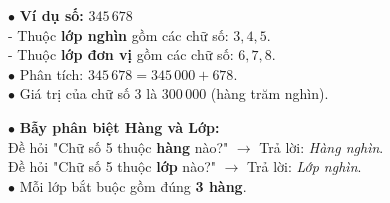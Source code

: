 \documentclass[14pt,a4paper,oneside]{extbook}
\begin{document}
\vspace{2.5mm}

\noindent
\begin{minipage}[t]{0.54\textwidth}
  \begin{tcolorbox}[
    enhanced,
    title={\footnotesize\bfseries\color{white}\faKey\ Phân tích số theo từng lớp},
    colback=green!3!white,
    colframe=green!60!black,
    arc=2.5mm, boxrule=0.8pt, top=1.8mm, bottom=1.8mm, left=2.2mm, right=2.2mm
  ]
    \footnotesize
    $\bullet$ \textbf{Ví dụ số:} $345\,678$\\
    - Thuộc \textbf{lớp nghìn} gồm các chữ số: $3, 4, 5$.\\
    - Thuộc \textbf{lớp đơn vị} gồm các chữ số: $6, 7, 8$.\\
    $\bullet$ Phân tích: $345\,678 = 345\,000 + 678$.\\
    $\bullet$ Giá trị của chữ số $3$ là $300\,000$ (hàng trăm nghìn).
  \end{tcolorbox}
\end{minipage}%
\hfill
\begin{minipage}[t]{0.44\textwidth}
  \begin{tcolorbox}[
    enhanced,
    title={\footnotesize\bfseries\color{white}\faExclamationTriangle\ Mẹo tránh bẫy trắc nghiệm},
    colback=red!2!white,
    colframe=red!70!black,
    arc=2.5mm, boxrule=0.8pt, top=1.8mm, bottom=1.8mm, left=2.2mm, right=2.2mm
  ]
    \footnotesize
    $\bullet$ \textbf{Bẫy phân biệt Hàng và Lớp:}\\
    Đề hỏi "Chữ số 5 thuộc \textbf{hàng} nào?" $\rightarrow$ Trả lời: \textit{Hàng nghìn}.\\
    Đề hỏi "Chữ số 5 thuộc \textbf{lớp} nào?" $\rightarrow$ Trả lời: \textit{Lớp nghìn}.\\
    $\bullet$ Mỗi lớp bắt buộc gồm đúng \textbf{3 hàng}.
  \end{tcolorbox}
\end{minipage}
\end{document}

